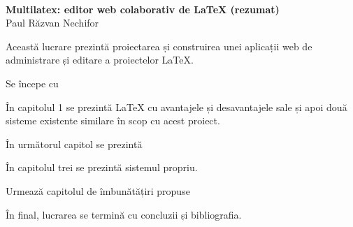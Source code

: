 \documentclass[a4wide,12pt]{report}
\begin{document}
\frenchspacing              %
\onehalfspace               %

\font=5.00pt     %
\font=2.00pt     %
\font=1.50pt     %
\font=0.00pt     %

\pagestyle{empty}

\begin{center}
    \mbox{}\\
    \vspace{1cm}
    {\Large{\textbf{Multilatex: editor web colaborativ de \LaTeX{} (rezumat)}}}\\
    \vspace{0.6cm}
    {\large{Paul Răzvan Nechifor}}\\
    \vspace{1cm}
\end{center}

Această lucrare prezintă proiectarea și construirea unei aplicații web de
administrare și editare a proiectelor \LaTeX{}.

Se începe cu

În capitolul 1 se prezintă \LaTeX{} cu avantajele și desavantajele sale și apoi
două sisteme existente similare în scop cu acest proiect.

În următorul capitol se prezintă

În capitolul trei se prezintă sistemul propriu.

Urmează capitolul de îmbunătățiri propuse

În final, lucrarea se termină cu concluzii și bibliografia.

\vspace{0.6cm}
{\large{\textbf{}}}\\
\end{document}
